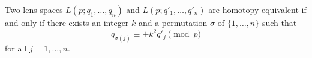 Two lens spaces $L(p; q_1, \ldots, q_n)$ and $L(p; q'_1, \ldots, q'_n)$ are homotopy equivalent if and only if there exists an integer $k$ and a permutation $\sigma$ of $\{1, \ldots, n\}$ such that
$$q_{\sigma(j)} \equiv \pm k^2 q'_j \pmod{p}$$
for all $j = 1, \ldots, n$.
